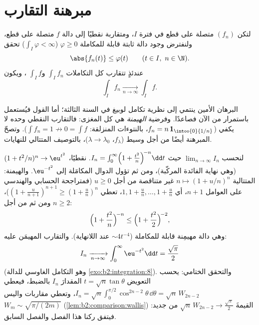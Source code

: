 \section{مبرهنة التقارب}

\begin{theorem}\label{thm:b2:integration:dominated}
لتكن $(f_n)$ متصلة على قطع في فترة $I$، ومتقاربة
نقطيًا إلى دالة $f$ متصلة على قطع، ولنفترض وجود
دالة ثابتة قابلة للمكاملة $\varphi \geq 0$ ($\int_I \varphi < \infty$)
تحقق
\[
\abs{f_n(t)} \leq \varphi(t) \qquad (t \in I,\ n \in \N).
\]
عندئذٍ تتقارب كل التكاملات $\int_I f_n$ و$\int_I f$ ، ويكون
\[
\int_I f_n \xrightarrow[n \to \infty]{} \int_I f .
\]
\end{theorem}
\admitted

\begin{remark}
البرهان الأمين ينتمي إلى نظرية تكامل لوبيغ في السنة
الثالثة؛ أما القول فيُستعمل باستمرار من الآن فصاعدًا. وفرضية
\emph{الهيمنة} هي كل المغزى: فالتقارب النقطي
وحده لا يكفي ($f_n = n\,\mathbf{1}_{\intoo{0}{1/n}}$،
بالنتوءات المنزلقة: $\int f_n = 1 \not\to 0 = \int f$). وتصحّ المبرهنة
أيضًا من أجل وسيط  ($f_\lambda$، $\lambda \to
\lambda_0$)، بالتوصيف المتتالي للنهايات.
\end{remark}

\begin{example}\label{ex:b2:integration:wallislimit}
لنحسب $\displaystyle\lim_{n\to\infty} I_n$ حيث $I_n =
\int_0^\infty \Bigl(1 + \frac{t^2}{n}\Bigr)^{\!-n}\dd t$.
نقطيًا، $(1 + t^2/n)^n \to \eu^{t^2}$ (وهي نهاية
الفائدة المركّبة)، ومن ثم تؤول الدوال المكامَلة إلى $\eu^{-t^2}$. والهيمنة:
المتتالية $n \mapsto (1 + u/n)^n$ غير متناقصة من أجل $u \geq 0$
(فمتراجحة الحسابي والهندسي على العوامل $n + 1$، أي $1, 1 + \frac un, \dots, 1 +
\frac un$، تعطي $(1 + \frac u{n+1})^{n+1} \geq (1 + \frac
un)^n$)، ومن ثم من أجل $n \geq 2$:
\[
\Bigl(1 + \frac{t^2}{n}\Bigr)^{\!-n}
\leq \Bigl(1 + \frac{t^2}{2}\Bigr)^{\!-2},
\]
وهي دالة مهيمِنة قابلة للمكاملة ($\sim 4t^{-4}$ عند اللانهاية). والتقارب
المهيمَن عليه:
\[
I_n \xrightarrow[n\to\infty]{} \int_0^\infty \eu^{-t^2}\dd t
= \frac{\sqrt\pi}{2}
\]
(وهو التكامل الغاوسي للدالة \cref{exo:b2:integration:8}). والتحقق
الختامي: يحسب التعويض $t = \sqrt n\tan\theta$ المقدارَ $I_n$
بالضبط، فيعطي $I_n = \sqrt n\int_0^{\pi/2}\cos^{2n-2}\theta\,\dd\theta
= \sqrt n\,W_{2n-2}$، وتعطي مقاربات واليس $W_m \sim
\sqrt{\pi/(2m)}$ (\cref{lem:b2:comparison:wallis}) القيمةَ $\sqrt
n\,W_{2n-2} \to \frac{\sqrt\pi}2$ من جديد: فيتفق ركنا
هذا الفصل والفصل السابق.
\end{example}

